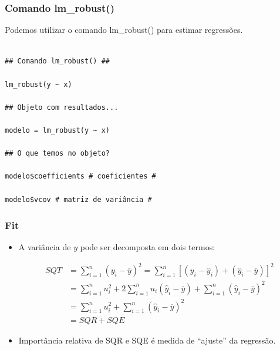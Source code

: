 \documentclass[10pt,slides,xcolor=pdftex,dvipsnames,table]{beamer}
\begin{document}
\begin{frame}[fragile]
	\frametitle{Comando lm\_robust()}
	
\vspace{0.5cm}
Podemos utilizar o comando lm\_robust() para estimar regressões.

\begin{lstlisting}

## Comando lm_robust() ##

lm_robust(y ~ x)

## Objeto com resultados...

modelo = lm_robust(y ~ x)

## O que temos no objeto? 

modelo$coefficients # coeficientes #

modelo$vcov # matriz de variância #

\end{lstlisting}

\end{frame}


\begin{frame}[fragile]
	\frametitle{Fit}
	
\begin{itemize}\itemsep1.2em 

\item A variância de $y$ pode ser decomposta em dois termos:

\begin{align*}
SQT &= \sum_{i=1}^n (y_i - \overline{y})^2 = \sum_{i=1}^n \left[ (y_i - \hat{y}_i) + (\hat{y}_i - \overline{y})\right]^2 \\
&= \sum_{i=1}^n u_i^2 + 2 \sum_{i=1}^n u_i (\hat{y}_i - \overline{y}) + \sum_{i=1}^n (\hat{y}_i - \overline{y})^2 \\
&=  \sum_{i=1}^n u_i^2 + \sum_{i=1}^n (\hat{y}_i - \overline{y})^2 \\
&= SQR + SQE
\end{align*}

\item Importância relativa de SQR e SQE é medida de ``ajuste'' da regressão.

\end{itemize}

\end{frame}

\end{document}
